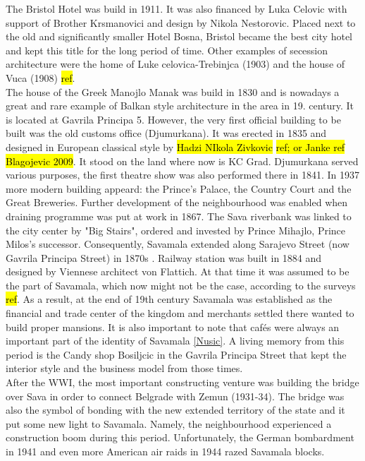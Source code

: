 \documentclass[11pt]{report}
\begin{document}
The Bristol Hotel was build in 1911. It was also financed by Luka Celovic with support of Brother Krsmanovici and design by Nikola Nestorovic. Placed next to the old and significantly smaller Hotel Bosna, Bristol became the best city hotel and kept this title for the long period of time.
Other examples of secession architecture were the home of Luke celovica-Trebinjca (1903) and the house of Vuca (1908) \hl{ref}.
\\
The house of the Greek Manojlo Manak was build in 1830 and is nowadays a great and rare example of Balkan style architecture in the area in 19. century. It is located at Gavrila Principa 5.
However, the very first official building to be built was the old customs office (Djumurkana). It was erected in 1835 and designed in European classical style by \hl{Hadzi NIkola Zivkovic} \hl{ref; or Janke ref Blagojevic 2009}. It stood on the land where now is KC Grad. Djumurkana served various purposes, the first theatre show was also performed there in 1841.
In 1937 more modern building appeard: the Prince's Palace\footnotemark, the Country Court and the Great Breweries.
Further development of the neighbourhood was enabled when draining programme was put at work in 1867. The Sava riverbank was linked to the city center by "Big Stairs", ordered and invested by Prince Mihajlo, Prince Milos's successor.
Consequently, Savamala extended along Sarajevo Street (now Gavrila Principa Street) in 1870s \cite{Bureau Savamala}.
Railway station was built in 1884 and designed by Viennese architect von Flattich. At that time it was assumed to be the part of Savamala, which now might not be the case, according to the surveys \hl{ref}.
As a result, at the end of 19th century Savamala was established as the financial and trade center of the kingdom and merchants settled there wanted to build proper mansions.
It is also important to note that cafés were always an important part of the identity of Savamala \ref{Nusic}. A living memory from this period is the Candy shop Bosiljcic in the Gavrila Principa Street that kept the interior style and the business model from those times.
\\
After the WWI, the most important constructing venture was building the bridge over Sava in order to connect Belgrade with Zemun (1931-34). The bridge was also the symbol of bonding with the new extended territory of the state and it put some new light to Savamala. Namely, the neighbourhood experienced a construction boom during this period. Unfortunately, the German bombardment in 1941 and even more American air raids in 1944 razed Savamala blocks.
\end{document}
